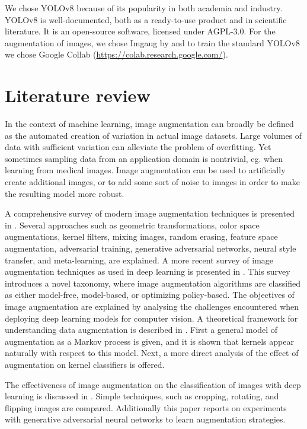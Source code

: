 \documentclass[]{article}
\begin{document}
	We chose YOLO{\small v8} because of its popularity in both academia and industry. YOLO{\small v8} is well-documented, both as a ready-to-use product and in scientific literature. It is an open-source software, licensed under AGPL-3.0. For the augmentation of images, we chose Imgaug by \cite{imgaug} and to train the standard YOLO{\small v8} we chose Google Collab (\url{https://colab.research.google.com/}).

\section{Literature review}

	In the context of machine learning, image augmentation can broadly be defined as the automated creation of variation in actual image datasets. Large volumes of data with sufficient variation can alleviate the problem of overfitting. Yet sometimes sampling data from an application domain is nontrivial, eg. when learning from medical images.  Image augmentation can be used to artificially create additional images, or to add some sort of noise to images in order to make the resulting model more robust.
	
	A comprehensive survey of modern image augmentation techniques is presented in \cite{shortenSurveyImageData2019}. Several approaches such as geometric transformations, color space augmentations, kernel filters, mixing images, random erasing, feature space augmentation, adversarial training, generative adversarial networks, neural style transfer, and meta-learning, are explained.  A more recent survey of image augmentation techniques as used in deep learning is presented in \cite{xuComprehensiveSurveyImage2023} . This survey introduces a novel taxonomy, where image augmentation algorithms are classified as either model-free, model-based, or optimizing policy-based. The objectives of image augmentation are explained by analysing the challenges encountered when deploying deep learning models for computer vision. A theoretical framework for understanding data augmentation is described in \cite{daoKernelTheoryModern2019}. First a general model of augmentation as a Markov process is given, and it is shown that kernels appear naturally with respect to this model. Next, a more direct analysis of the effect of augmentation on kernel classifiers is offered.
	
	The effectiveness of image augmentation on the classification of images with deep learning is discussed in \cite{perezEffectivenessDataAugmentation2017}. Simple techniques, such as cropping, rotating, and flipping images are compared. Additionally this paper reports on experiments with generative adversarial neural networks to learn augmentation strategies.
	
\end{document}
